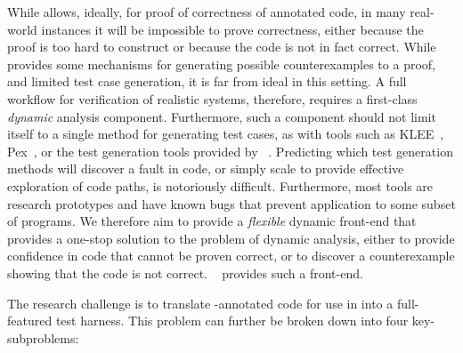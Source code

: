 While \framac allows, ideally, for proof of correctness of annotated code, in many real-world instances it will be impossible to prove correctness, either because the proof is too hard to construct or because the code is not in fact correct.  While \framac provides some mechanisms for generating possible counterexamples to a proof, and limited test case generation, it is far from ideal in this setting.  A full workflow for verification of realistic systems, therefore, requires a first-class \emph{dynamic} analysis component.  Furthermore, such a component should not limit itself to a single method for generating test cases, as with tools such as KLEE~\cite{KLEE}, Pex~\cite{Pex}, or the test generation tools provided by \framac~\cite{PathCrawler}.  Predicting which test generation methods will discover a fault in code, or simply scale to provide effective exploration of code paths, is notoriously difficult.  Furthermore, most tools are research prototypes and have known bugs that prevent application to some subset of programs.  We therefore aim to provide a \emph{flexible} dynamic front-end that provides a one-stop solution to the problem of dynamic analysis, either to provide confidence in code that cannot be proven correct, or to discover a counterexample showing that the code is not correct.  \deepstate~\cite{DeepState} provides such a front-end.

The research challenge is to translate \acsl-annotated code for use in \framac into a full-featured \deepstate test harness.  This problem can further be broken down into four key-subproblems:

